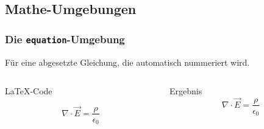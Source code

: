 \subsection{Mathe-Umgebungen}
\begin{frame}[fragile]
    \frametitle{Die \texttt{equation}-Umgebung}
    Für eine abgesetzte Gleichung, die automatisch nummeriert wird.
    \begin{columns}[T]
        \begin{column}{0.6\textwidth}
            \begin{block}{\LaTeX-Code}
                \begin{lstverbatim}
                \begin{equation}
                    \nabla \cdot \vec{E} = 
                    \frac{\rho} {\epsilon_0}
                    \label{eq:maxwell1}
                \end{equation}
                \end{lstverbatim}
            \end{block}
        \end{column}
        \begin{column}{0.35\textwidth}
            \begin{block}{Ergebnis}
                \begin{equation}
                    \nabla \cdot \vec{E} = 
                    \frac{\rho}{\epsilon_0}
                    \label{eq:maxwell1}
                \end{equation}
            \end{block}
        \end{column}
    \end{columns}
\end{frame}
